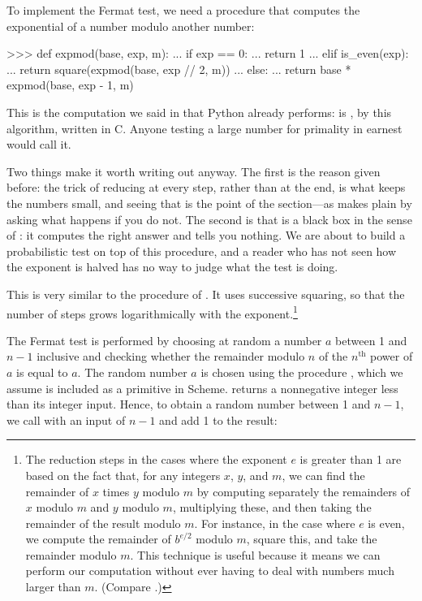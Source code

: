 To implement the Fermat test, we need a procedure that computes the exponential
of a number modulo another number:

\begin{codeBlock}
>>> def expmod(base, exp, m):
...     if exp == 0:
...         return 1
...     elif is_even(exp):
...         return square(expmod(base, exp // 2, m)) %
...     else:
...         return base * expmod(base, exp - 1, m) %
\end{codeBlock}

\begin{revealTheSurface}
This is the computation we said in  that Python already
performs:  is , by this
algorithm, written in C.  Anyone testing a large number for primality in
earnest would call it.

Two things make it worth writing out anyway.  The first is the reason given
before: the trick of reducing at every step, rather than at the end, is what
keeps the numbers small, and seeing that is the point of the section---as
 makes plain by asking what happens if you do not.  The
second is that  is a black box in the sense of
: it computes the right answer and tells you nothing.  We
are about to build a probabilistic test on top of this procedure, and a reader
who has not seen how the exponent is halved has no way to judge what the test
is doing.
\end{revealTheSurface}

\noindent
This is very similar to the  procedure of .
It uses successive squaring, so that the number of steps grows logarithmically
with the exponent.\footnote{The reduction steps in the cases where the exponent
\( e \) is greater than 1 are based on the fact that, for any integers \( x \),
\( y \), and \( m \), we can find the remainder of \( x \) times \( y \) modulo \( m \)
by computing separately the remainders of \( x \) modulo \( m \) and \( y \) modulo
\( m \), multiplying these, and then taking the remainder of the result modulo
\( m \).  For instance, in the case where \( e \) is even, we compute the remainder
of \( b^{e / 2} \) modulo \( m \), square this, and take the remainder modulo
\( m \).  This technique is useful because it means we can perform our
computation without ever having to deal with numbers much larger than \( m \).
(Compare .)}

The Fermat test is performed by choosing at random a number \( a \) between 1 and
\( n-1 \) inclusive and checking whether the remainder modulo \( n \) of the
\( n^{\mathrm{th}} \) power of \( a \) is equal to \( a \).  The random number \( a \) is chosen
using the procedure , which we assume is included as a primitive
in Scheme.  returns a nonnegative integer less than its integer
input.  Hence, to obtain a random number between 1 and \( n-1 \), we call
 with an input of \( n-1 \) and add 1 to the result:


